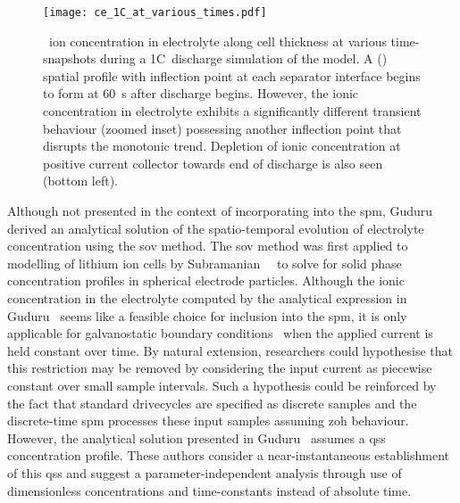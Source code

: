 \begin{figure}[!htbp]
    \centering
    \texttt{[image: ce\_1C\_at\_various\_times.pdf]}
    \caption[Electrolyte conc.\ (time-snapshots) along cell thickness for 1C~discharge]{~ion concentration in electrolyte along cell thickness
        at various time-snapshots during a 1C~discharge simulation of the
         model. A  () spatial
        profile  with inflection point at each separator interface begins to
        form at \approx \SI{60}{\second} after discharge begins. However, the
        ionic concentration in electrolyte exhibits a significantly different
        transient behaviour (zoomed inset) possessing another inflection point
        that disrupts the monotonic trend. Depletion of ionic concentration at
        positive current collector  towards end of discharge is also seen
    (bottom left).}
    \label{fig:ce1cdischgwithzoom}
\end{figure}

Although  not presented  in the  context  of incorporating  into the  \gls{spm},
Guduru~\etal~\cite{Guduru2012}   derived   an   analytical   solution   of   the
spatio-temporal  evolution  of  electrolyte concentration  using  the  \gls{sov}
method.  The \gls{sov}  method was  first applied  to modelling  of lithium  ion
cells  by Subramanian~\etal~\cite{Subramanian2001a}  to  solve  for solid  phase
concentration  profiles in  spherical  electrode particles.  Although the  ionic
concentration  in  the electrolyte  computed  by  the analytical  expression  in
Guduru~\etal{} seems like a feasible choice for inclusion into the \gls{spm}, it
is only  applicable for galvanostatic  boundary conditions \ie~when  the applied
current  is held  constant over  time. By  natural extension,  researchers could
hypothesise  that this  restriction  may  be removed  by  considering the  input
current as  piecewise constant  over small sample  intervals. Such  a hypothesis
could  be  reinforced  by  the  fact that  standard  drivecycles  are  specified
as  discrete  samples and  the  discrete-time  \gls{spm} processes  these  input
samples assuming \gls{zoh} behaviour. However, the analytical solution presented
in  Guduru~\etal{}  assumes a  \gls{qss}  concentration  profile. These  authors
consider  a near-instantaneous  establishment of  this \gls{qss}  and suggest  a
parameter-independent analysis  through use of dimensionless  concentrations and
time-constants instead of absolute time.

